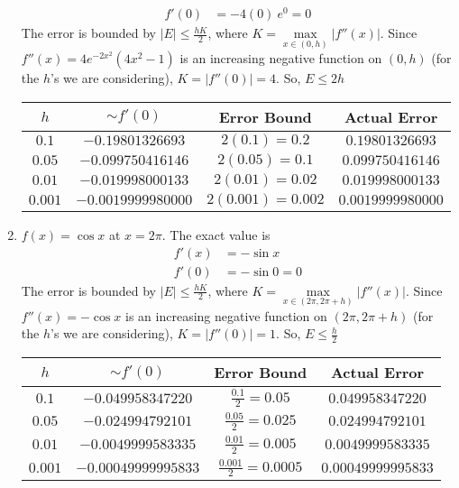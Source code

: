 \documentclass[12pt]{article}
\begin{document}
\begin{enumerate}[\ \ (a)\ \ ]
\begin{align*}
        f'(0) &= -4(0)\ e^0 = 0
    \end{align*}
    The error is bounded by $|E| \leq \displaystyle\frac{hK}{2}$, where $K = \max\limits_{x\in(0, h)}\left|f''(x)\right|$.  Since $f''(x) = 4e^{-2x^2}(4x^2 - 1)$ is an increasing negative function on $(0, h)$ (for the $h$'s we are considering), $K = |f''(0)| = 4$.  So, $E \leq 2h$
    \begin{table}[H]
        \begin{tabular}{||c|c|c|c||} \hline\hline
            $h$ & $\sim f'(0)$ & {\bf Error Bound} & {\bf Actual Error} \\ \hline
            $0.1$ & $-0.19801326693$ & $2(0.1) = 0.2$ & $0.19801326693$ \\ \hline
            $0.05$ & $-0.099750416146$ & $2(0.05) = 0.1$ & $0.099750416146$ \\ \hline
            $0.01$ & $-0.019998000133$ & $2(0.01) = 0.02$ & $0.019998000133$ \\ \hline
            $0.001$ & $-0.0019999980000$ & $2(0.001) = 0.002$ & $0.0019999980000$ \\ \hline \hline
        \end{tabular}
    \end{table}
    \item $f(x) = \cos{x}$ at $x = 2\pi$.  The exact value is
    \begin{align*}
        f'(x) &= -\sin{x} \\
        f'(0) &= -\sin{0} = 0
    \end{align*}
    The error is bounded by $|E| \leq \displaystyle\frac{hK}{2}$, where $K = \max\limits_{x\in(2\pi, 2\pi + h)}\left|f''(x)\right|$.  Since $f''(x) = -\cos{x}$ is an increasing negative function on $(2\pi, 2\pi + h)$ (for the $h$'s we are considering), $K = |f''(0)| = 1$.  So, $E \leq \displaystyle\frac{h}{2}$
    \begin{table}[H]
        \begin{tabular}{||c|c|c|c||} \hline\hline
            $h$ & $\sim f'(0)$ & {\bf Error Bound} & {\bf Actual Error} \\ \hline
            $0.1$ & $-0.049958347220$ & $\frac{0.1}{2} = 0.05$ & $0.049958347220$ \\ \hline
            $0.05$ & $-0.024994792101$ & $\frac{0.05}{2} = 0.025$ & $0.024994792101$ \\ \hline
            $0.01$ & $-0.0049999583335$ & $\frac{0.01}{2} = 0.005$ & $0.0049999583335$ \\ \hline
            $0.001$ & $-0.00049999995833$ & $\frac{0.001}{2} = 0.0005$ & $0.00049999995833$ \\ \hline \hline

\end{tabular}
\end{table}
\end{enumerate}
\end{document}
